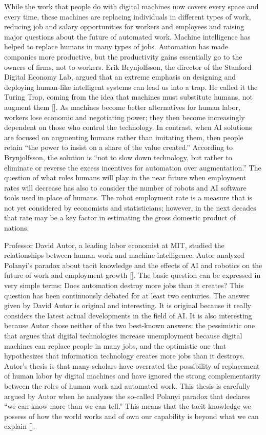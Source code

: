 While the work that people do with digital machines now covers every space and every time, these machines are replacing individuals in different types of work, reducing job and salary opportunities for workers and employees and raising major questions about the future of automated work. Machine intelligence has helped to replace humans in many types of jobs. Automation has made companies more productive, but the productivity gains essentially go to the owners of firms, not to workers. Erik Brynjolfsson, the director of the Stanford Digital Economy Lab, argued that an extreme emphasis on designing and deploying human-like intelligent systems can lead us into a trap. He called it the Turing Trap, coming from the idea that machines must substitute humans, not augment them [\citealt{chap:6:Brynjolfsson:2022}]. As machines become better alternatives for human labor, workers lose economic and negotiating power; they then become increasingly dependent on those who control the technology. In contrast, when AI solutions are focused on augmenting humans rather than imitating them, then people retain ``the power to insist on a share of the value created.'' According to Brynjolfsson, the solution is ``not to slow down technology, but rather to eliminate or reverse the excess incentives for automation over augmentation.'' The question of what roles humans will play in the near future when employment rates will decrease has also to consider the number of robots and AI software tools used in place of humans. The robot employment rate is a measure that is not yet considered by economists and statisticians; however, in the next decades that rate may be a key factor in estimating the gross domestic product of nations.

Professor David Autor, a leading labor economist at MIT, studied the relationships between human work and machine intelligence. Autor analyzed Polanyi's paradox about tacit knowledge and the effects of AI and robotics on the future of work and employment growth [\citealt{chap:6:Autor:2014}]. The basic question can be expressed in very simple terms: Does automation destroy more jobs than it creates? This question has been continuously debated for at least two centuries. The answer given by David Autor is original and interesting. It is original because it really considers the latest actual developments in the field of AI. It is also interesting because Autor chose neither of the two best-known answers: the pessimistic one that argues that digital technologies increase unemployment because digital machines can replace people in many jobs, and the optimistic one that hypothesizes that information technology creates more jobs than it destroys. Autor's thesis is that many scholars have overrated the possibility of replacement of human labor by digital machines and have ignored the strong complementarity between the roles of human work and automated work. This thesis is carefully argued by Autor when he analyzes the so-called Polanyi paradox that declares ``we can know more than we can tell.'' This means that the tacit knowledge we possess of how the world works and of own our capability is beyond what we can explain [\citealt{chap:6:Polanyi:2009}].


